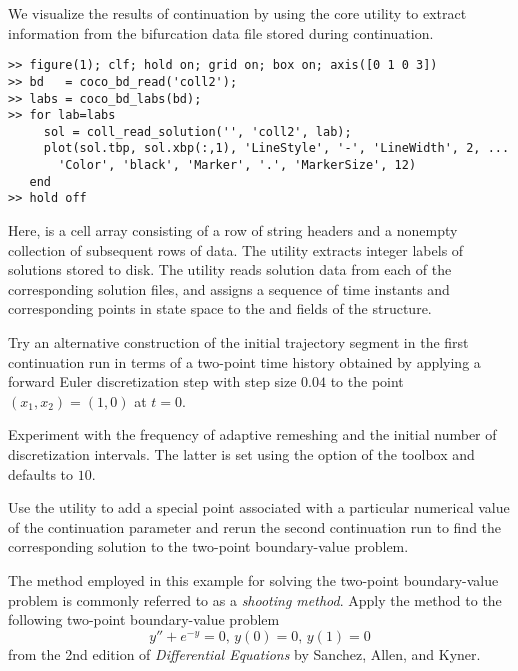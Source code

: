 We visualize the results of continuation by using the  core utility to extract information from the bifurcation data file stored during continuation.
\begin{lstlisting}[language=coco-highlight]
>> figure(1); clf; hold on; grid on; box on; axis([0 1 0 3])
>> bd   = coco_bd_read('coll2');
>> labs = coco_bd_labs(bd);
>> for lab=labs
     sol = coll_read_solution('', 'coll2', lab);
     plot(sol.tbp, sol.xbp(:,1), 'LineStyle', '-', 'LineWidth', 2, ...
       'Color', 'black', 'Marker', '.', 'MarkerSize', 12)
   end
>> hold off
\end{lstlisting}
Here,  is a cell array consisting of a row of string headers and a nonempty collection of subsequent rows of data. The  utility extracts integer labels of solutions stored to disk. The  utility reads solution data from each of the corresponding solution files, and assigns a sequence of time instants and corresponding points in state space to the  and  fields of the  structure.
\newline
\begin{exercises}
\item Try an alternative construction of the initial trajectory segment in the first continuation run in terms of a two-point time history obtained by applying a forward Euler discretization step with step size $0.04$ to the point $(x_1,x_2)=(1,0)$ at $t=0$.

\item Experiment with the frequency of adaptive remeshing and the initial number of discretization intervals. The latter is set using the  option of the  toolbox and defaults to $10$.

\item Use the  utility to add a special point associated with a particular numerical value of the continuation parameter  and rerun the second continuation run to find the corresponding solution to the two-point boundary-value problem.

\item The method employed in this example for solving the two-point boundary-value problem is commonly referred to as a \emph{shooting method}. Apply the method to the following two-point boundary-value problem
\[
y''+e^{-y}=0,\,y(0)=0,\,y(1)=0
\]
from the 2nd edition of \emph{Differential Equations} by Sanchez, Allen, and Kyner.
\end{exercises}

